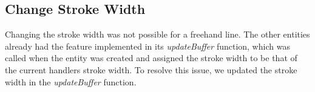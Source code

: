 \subsection{Change Stroke Width}
Changing the stroke width was not possible for a freehand line.
The other entities already had the feature implemented in its \textit{updateBuffer} function, which was called when the entity was created and assigned the stroke width to be that of the current handlers stroke width.
To resolve this issue, we updated the stroke width in the \textit{updateBuffer} function.